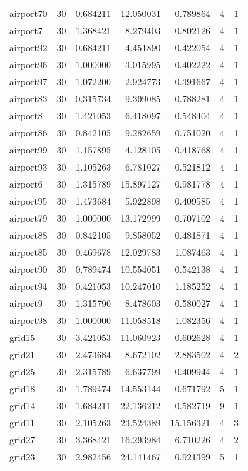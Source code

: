 \documentclass[../../../thesis.tex]{subfiles}
\begin{document}
\begin{longtable}{|l|r|r|r|r|r|r|}
airport70 & 30 & 0.684211 & 12.050031 & 0.789864 & 4 & 1 \\
airport7 & 30 & 1.368421 & 8.279403 & 0.802126 & 4 & 1 \\
airport92 & 30 & 0.684211 & 4.451890 & 0.422054 & 4 & 1 \\
airport96 & 30 & 1.000000 & 3.015995 & 0.402222 & 4 & 1 \\
airport97 & 30 & 1.072200 & 2.924773 & 0.391667 & 4 & 1 \\
airport83 & 30 & 0.315734 & 9.309085 & 0.788281 & 4 & 1 \\
airport8 & 30 & 1.421053 & 6.418097 & 0.548404 & 4 & 1 \\
airport86 & 30 & 0.842105 & 9.282659 & 0.751020 & 4 & 1 \\
airport99 & 30 & 1.157895 & 4.128105 & 0.418768 & 4 & 1 \\
airport93 & 30 & 1.105263 & 6.781027 & 0.521812 & 4 & 1 \\
airport6 & 30 & 1.315789 & 15.897127 & 0.981778 & 4 & 1 \\
airport95 & 30 & 1.473684 & 5.922898 & 0.409585 & 4 & 1 \\
airport79 & 30 & 1.000000 & 13.172999 & 0.707102 & 4 & 1 \\
airport88 & 30 & 0.842105 & 9.858052 & 0.481871 & 4 & 1 \\
airport85 & 30 & 0.469678 & 12.029783 & 1.087463 & 4 & 1 \\
airport90 & 30 & 0.789474 & 10.554051 & 0.542138 & 4 & 1 \\
airport94 & 30 & 0.421053 & 10.247010 & 1.185252 & 4 & 1 \\
airport9 & 30 & 1.315790 & 8.478603 & 0.580027 & 4 & 1 \\
airport98 & 30 & 1.000000 & 11.058518 & 1.082356 & 4 & 1 \\
grid15 & 30 & 3.421053 & 11.060923 & 0.602628 & 4 & 1 \\
grid21 & 30 & 2.473684 & 8.672102 & 2.883502 & 4 & 2 \\
grid25 & 30 & 2.315789 & 6.637799 & 0.409944 & 4 & 1 \\
grid18 & 30 & 1.789474 & 14.553144 & 0.671792 & 5 & 1 \\
grid14 & 30 & 1.684211 & 22.136212 & 0.582719 & 9 & 1 \\
grid11 & 30 & 2.105263 & 23.524389 & 15.156321 & 4 & 3 \\
grid27 & 30 & 3.368421 & 16.293984 & 6.710226 & 4 & 2 \\
grid23 & 30 & 2.982456 & 24.141467 & 0.921399 & 5 & 1 \\

\end{longtable}
\end{document}
